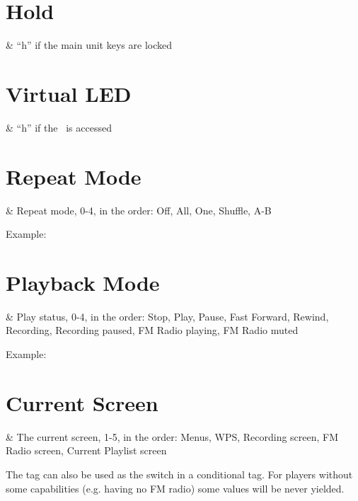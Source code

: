 \section{Hold}
    \begin{tagmap}
         & ``h'' if the main unit keys are locked\\
    \end{tagmap}

\section{Virtual LED}
  \begin{tagmap}
     & ``h'' if the \disk\ is accessed\\
  \end{tagmap}

\section{Repeat Mode}
  \begin{tagmap}
     & Repeat mode, 0-4, in the order: Off, All, One, Shuffle, A-B\\
  \end{tagmap}
Example: 

\section{Playback Mode}
  \begin{tagmap}
     & Play status, 0-4, in the order: Stop, Play, Pause, 
           Fast Forward, Rewind, Recording, Recording paused, FM Radio playing,
           FM Radio muted\\
  \end{tagmap}
Example: 

\section{Current Screen}
  \begin{tagmap}
     & The current screen, 1-5, in the order:
                Menus, WPS, Recording screen, FM Radio screen, Current Playlist screen\\
  \end{tagmap}
The tag can also be used as the switch in a conditional tag. For players without
some capabilities (e.g. having no FM radio) some values will be never yielded.

